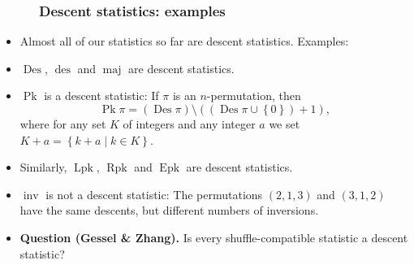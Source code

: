 \documentclass{beamer}
\newcommand{\Lpk}{\operatorname{Lpk}}
\newcommand{\Rpk}{\operatorname{Rpk}}
\newcommand{\Pk}{\operatorname{Pk}}
\newcommand{\Epk}{\operatorname{Epk}}
\newcommand{\Des}{\operatorname{Des}}
\newcommand{\des}{\operatorname{des}}
\newcommand{\inv}{\operatorname{inv}}
\newcommand{\maj}{\operatorname{maj}}
\newcommand{\fti}[1]{\frametitle{\ \ \ \ \ #1}}
\newcommand{\set}[1]{\left\{ #1 \right\}}
\newcommand{\tup}[1]{\left( #1 \right)}
\newcommand{\defn}[1]{{\color{darkred}\emph{#1}}} %
\theoremstyle{plain}
\begin{document}
\begin{frame}
\begin{itemize}
\end{itemize}

\vspace{10cm}

\end{frame}

\begin{frame}
\fti{Descent statistics: examples}

\begin{itemize}

\item Almost all of our statistics so far are descent statistics.
     Examples:

\pause

\item $\Des$, $\des$ and $\maj$ are descent statistics.

\pause

\item $\Pk$ is a descent statistic: If $\pi$ is an $n$-permutation,
      then
      \[
      \Pk \pi = \tup{\Des \pi} \setminus \tup{\tup{\Des \pi \cup \set{0}} + 1} ,
      \]
      where for any set $K$ of integers and any integer $a$
      we set \defn{$K + a = \set{k + a \mid k \in K}$}.

\item Similarly, $\Lpk$, $\Rpk$ and $\Epk$ are descent statistics.

\pause

\item $\inv$ is not a descent statistic:
      The permutations $\tup{2,1,3}$ and $\tup{3,1,2}$ have the same
      descents, but different numbers of inversions.

\pause

\item \textbf{Question (Gessel \& Zhang).}
      Is every shuffle-compatible statistic a descent statistic?

\end{itemize}

\end{frame}
\end{document}
